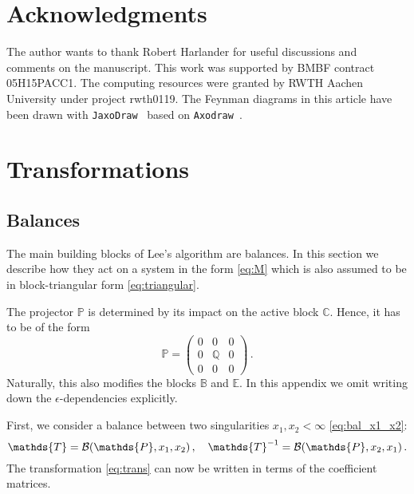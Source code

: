 \documentclass[12pt]{article}
\numberwithin{equation}{section}
\numberwithin{figure}{section}
\newcommand{\B}{\mathds{B}}
\newcommand{\C}{\mathds{C}}
\newcommand{\E}{\mathds{E}}
\newcommand{\T}{\mathds{T}}
\renewcommand{\P}{\mathds{P}}
\newcommand{\Q}{\mathds{Q}}
\begin{document}
  \section*{Acknowledgments}
    The author wants to thank Robert Harlander for useful discussions and comments on the manuscript.
    This work was supported by BMBF contract 05H15PACC1.
    The computing resources were granted by RWTH Aachen University under project rwth0119.
    The Feynman diagrams in this article have been drawn with \texttt{JaxoDraw}~\cite{Binosi:2008ig} based on \texttt{Axodraw}~\cite{Vermaseren:1994je}.
  \appendix
  \section{Transformations} \label{sect:app_bal}
    \subsection{Balances}
      The main building blocks of Lee's algorithm are balances.
      In this section we describe how they act on a system in the form \eqref{eq:M} which is also assumed to be in block-triangular form \eqref{eq:triangular}.

      The projector $\P$ is determined by its impact on the active block $\C$.
      Hence, it has to be of the form
      \[
        \P = \begin{pmatrix}
          0 & 0 & 0 \\
          0 & \Q & 0 \\
          0 & 0 & 0
        \end{pmatrix}\,.
      \]        
      Naturally, this also modifies the blocks $\B$ and $\E$.
      In this appendix we omit writing down the $\epsilon$-dependencies explicitly.

      First, we consider a balance between two singularities $x_1, x_2 < \infty$ \eqref{eq:bal_x1_x2}:
      \[
        \T = {\cal B}(\P,x_1,x_2)\,, \quad
        \T^{-1} = {\cal B}(\P,x_2,x_1)\,.
      \]
      The transformation \eqref{eq:trans} can now be written in terms of the coefficient matrices.
\end{document}
